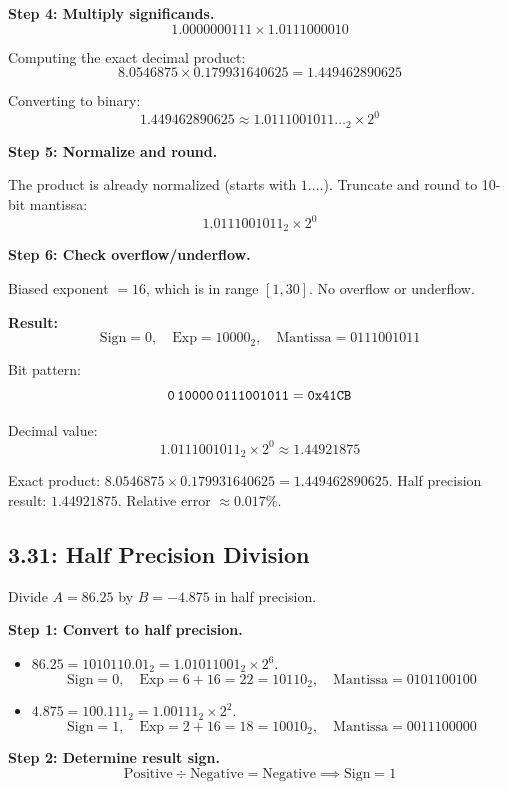 \noindent\textbf{Step 4: Multiply significands.}
\[
  1.0000000111 \times 1.0111000010
\]

Computing the exact decimal product:
\[
  8.0546875 \times 0.179931640625 = 1.449462890625
\]

Converting to binary:
\[
  1.449462890625 \approx 1.0111001011\ldots_2 \times 2^0
\]

\noindent\textbf{Step 5: Normalize and round.}

The product is already normalized (starts with $1.\ldots$). Truncate and round
to 10-bit mantissa:
\[
  1.0111001011_2 \times 2^0
\]

\noindent\textbf{Step 6: Check overflow/underflow.}

Biased exponent $= 16$, which is in range $[1, 30]$. No overflow or underflow.

\noindent\textbf{Result:}
\[
  \text{Sign} = 0,\quad
  \text{Exp} = 10000_2,\quad
  \text{Mantissa} = 0111001011
\]

Bit pattern:
\[
  \texttt{0\,10000\,0111001011} = \texttt{0x41CB}
\]

Decimal value:
\[
  1.0111001011_2 \times 2^0 \approx 1.44921875
\]

Exact product: $8.0546875 \times 0.179931640625 = 1.449462890625$.
Half precision result: $1.44921875$. Relative error $\approx 0.017\%$.

\subsection*{3.31: Half Precision Division}
\hypertarget{sol-3.31}{}

Divide $A = 86.25$ by $B = -4.875$ in half precision.

\noindent\textbf{Step 1: Convert to half precision.}
\begin{itemize}
  \item $86.25 = 1010110.01_2 = 1.01011001_2 \times 2^6$.
    \[
      \text{Sign} = 0,\quad
      \text{Exp} = 6 + 16 = 22 = 10110_2,\quad
      \text{Mantissa} = 0101100100
    \]
  \item $4.875 = 100.111_2 = 1.00111_2 \times 2^2$.
    \[
      \text{Sign} = 1,\quad
      \text{Exp} = 2 + 16 = 18 = 10010_2,\quad
      \text{Mantissa} = 0011100000
    \]
\end{itemize}

\noindent\textbf{Step 2: Determine result sign.}
\[
  \text{Positive} \div \text{Negative} = \text{Negative} \implies \text{Sign} = 1
\]

